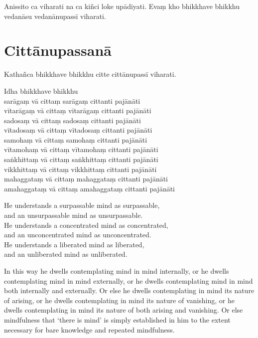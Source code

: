 Anissito ca viharati na ca kiñci loke upādiyati. Evaṃ kho bhikkhave bhikkhu
vedanāsu vedanānupassī viharati.


\chapter*{Cittānupassanā}

Kathañca bhikkhave bhikkhu citte cittānupassī viharati.

Idha bhikkhave bhikkhu\\
sarāgaṃ vā cittaṃ sarāgaṃ cittanti pajānāti\\
vītarāgaṃ vā cittaṃ vītarāgaṃ cittanti pajānāti\\
sadosaṃ vā cittaṃ sadosaṃ cittanti pajānāti\\
vītadosaṃ vā cittaṃ vītadosaṃ cittanti pajānāti\\
samohaṃ vā cittaṃ samohaṃ cittanti pajānāti\\
vītamohaṃ vā cittaṃ vītamohaṃ cittanti pajānāti\\
saṅkhittaṃ vā cittaṃ saṅkhittaṃ cittanti pajānāti\\
vikkhittaṃ vā cittaṃ vikkhittaṃ cittanti pajānāti\\
mahaggataṃ vā cittaṃ mahaggataṃ cittanti pajānāti\\
amahaggataṃ vā cittaṃ amahaggataṃ cittanti pajānāti

\englishPage
He understands a surpassable mind as surpassable,\\
and an unsurpassable mind as unsurpassable.\\
He understands a concentrated mind as concentrated,\\
and an unconcentrated mind as unconcentrated.\\
He understands a liberated mind as liberated,\\
and an unliberated mind as unliberated.

In this way he dwells contemplating mind in mind internally, or he dwells
contemplating mind in mind externally, or he dwells contemplating mind in mind
both internally and externally. Or else he dwells contemplating in mind its
nature of arising, or he dwells contemplating in mind its nature of vanishing,
or he dwells contemplating in mind its nature of both arising and vanishing. Or
else mindfulness that ‘there is mind’ is simply established in him to the extent
necessary for bare knowledge and repeated mindfulness.

